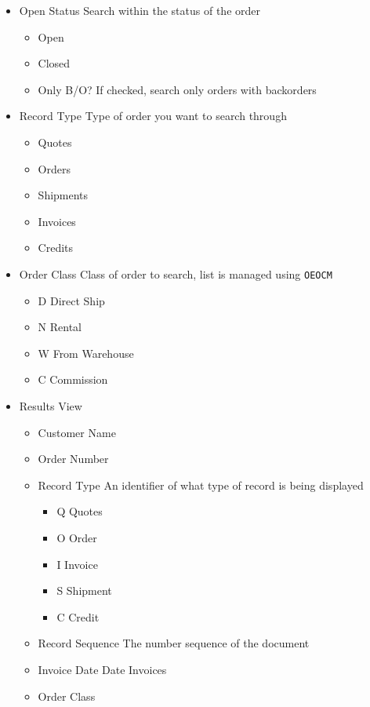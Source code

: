 \begin{itemize}
	\item Open Status \textemdash Search within the status of the order
	\begin{itemize}
		\item Open
		\item Closed
		\item Only B/O? \textemdash If checked, search only orders with backorders
	\end{itemize}
	\item Record Type \textemdash Type of order you want to search through
	\begin{itemize}
		\item Quotes
		\item Orders
		\item Shipments
		\item Invoices
		\item Credits
	\end{itemize}	
	\item Order Class \textemdash Class of order to search, list is managed using \texttt{OEOCM}
	\begin{itemize}
		\item D \textemdash Direct Ship
		\item N \textemdash Rental
		\item W \textemdash From Warehouse
		\item C \textemdash Commission
	\end{itemize}
	\item Results View
	\begin{itemize}
		\item Customer Name
		\item Order Number
		\item Record Type \textemdash An identifier of what type of record is being displayed
		\begin{itemize}
			\item Q \textemdash Quotes
			\item O \textemdash Order
			\item I \textemdash Invoice
			\item S \textemdash Shipment
			\item C \textemdash Credit
		\end{itemize}
		\item Record Sequence \textemdash The number sequence of the document
		\item Invoice Date \textemdash Date Invoices
		\item Order Class

\end{itemize}
\end{itemize}

